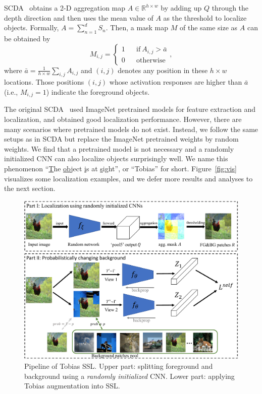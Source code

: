 \documentclass[letterpaper]{article} %
\begin{document}
SCDA~\citep{scda:tip17} obtains a 2-D aggregation map $A\in{\mathbb{R}^{h\times{w}}}$ by adding up $Q$ through the depth direction and then uses the mean value of $A$ as the threshold to localize objects. Formally, $A=\sum_{n=1}^d{S_n}$. Then, a mask map $M$ of the same size as $A$ can be obtained by
\begin{equation}
	M_{i,j} = \left\{
	\begin{array}{rcl}
		1&  & {\text{if}\ A_{i,j} > \bar{a}}\\
		0 && {\text{otherwise}}
	\end{array} \right. ,
\end{equation}
where $\bar{a}=\frac{1}{h\times{w}}\sum_{i,j}A_{i,j}$ and $(i,j)$ denotes any position in these $h\times{w}$ locations. Those positions $(i,j)$ whose activation responses are higher than $\bar{a}$ (i.e., $M_{i,j}=1$) indicate the foreground objects.

The original SCDA~\citep{scda:tip17} used ImageNet pretrained models for feature extraction and localization, and obtained good localization performance. However, there are many scenarios where pretrained models do not exist. Instead, we follow the same setups as in SCDA but replace the ImageNet pretrained weights by random weights. We find that a pretrained model is not necessary and a randomly initialized CNN can also localize objects surprisingly well. We name this phenomenon ``\underline{T}he \underline{ob}ject \underline{i}s at \underline{s}ight'', or ``Tobias'' for short. Figure~\ref{fig:vis} visualizes some localization examples, and we defer more results and analyses to the next section.

\begin{figure}[t]
	\centering
	\includegraphics[width=0.95\columnwidth]{network}
	\caption{Pipeline of Tobias SSL. Upper part: splitting foreground and background using a \textit{randomly initialized} CNN. Lower part: applying Tobias augmentation into SSL.}
	\label{fig:network}
\end{figure}
\end{document}
